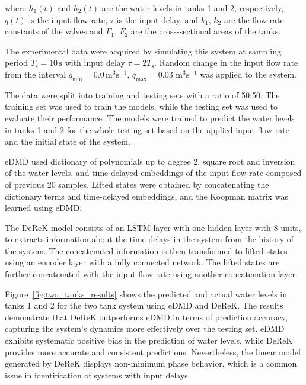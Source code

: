 \documentclass[conference]{IEEEtran}
\newcommand{\ui}[2]{#1_{\text{#2}}}
\begin{document}
where \(h_1(t)\) and \(h_2(t)\) are the water levels in tanks 1 and 2, respectively, \(q(t)\) is the input flow rate, \(\tau \) is the input delay, and \(k_1\), \(k_2\) are the flow rate constants of the valves and \(F_1\), \(F_2\) are the cross-sectional areas of the tanks.

The experimental data were acquired by simulating this system at sampling period \( \ui{T}{s} = 10 \, \mathrm{s} \) with input delay \( \tau = 2\ui{T}{s} \). Random change in the input flow rate from the interval \( \ui{q}{min} = 0.0 \, \text{m}^3\text{s}^{-1} \), \( \ui{q}{max} = 0.03 \) \( \text{m}^3\text{s}^{-1} \) was applied to the system.

The data were split into training and testing sets with a ratio of 50:50. The training set was used to train the models, while the testing set was used to evaluate their performance. The models were trained to predict the water levels in tanks 1 and 2 for the whole testing set based on the applied input flow rate and the initial state of the system.

eDMD used dictionary of polynomials up to degree 2, square root and inversion of the water levels, and time-delayed embeddings of the input flow rate composed of previous 20 samples. Lifted states were obtained by concatenating the dictionary terms and time-delayed embeddings, and the Koopman matrix was learned using eDMD.

The DeReK model consists of an LSTM layer with one hidden layer with 8 units, to extracts information about the time delays in the system from the history of the system. The concatenated information is then transformed to lifted states using an encoder layer with a fully connected network. The lifted states are further concatenated with the input flow rate using another concatenation layer.

Figure~\ref{fig:two_tanks_results} shows the predicted and actual water levels in tanks 1 and 2 for the two tank system using eDMD and DeReK. The results demonstrate that DeReK outperforms eDMD in terms of prediction accuracy, capturing the system's dynamics more effectively over the testing set. eDMD exhibits systematic positive bias in the prediction of water levels, while DeReK provides more accurate and consistent predictions. Nevertheless, the linear model generated by DeReK displays non-minimum phase behavior, which is a common issue in identification of systems with input delays.
\end{document}
